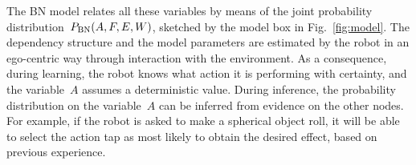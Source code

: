 The \ac{BN} model relates all these variables by means of the joint probability distribution~$P_{\text{BN}}(A, F, E, W)$, sketched by the \AffWords{} model box in Fig.~\ref{fig:model}.
The dependency structure and the model parameters are estimated by the robot in an ego-centric way through interaction with the environment.
As a consequence, during learning, the robot knows what action it is performing with certainty, and the variable~$A$ assumes a deterministic value.
During inference, the probability distribution on the variable~$A$ can be inferred from evidence on the other nodes.
For example, if the robot is asked to make a spherical object roll, it will be able to select the action tap as most likely to obtain the desired effect, based on previous experience.

\newcommand{\myscalefactor}{0.8}

\newcommand{\shapeOfHmmState}{circle} %

\newcommand{\standardhmm}[1]{
    \node[draw,\shapeOfHmmState] (hmm#1s1) {$s_1$};
    \node[draw,\shapeOfHmmState, right of=hmm#1s1] (hmm#1s2) {$s_2$};
    \node[\shapeOfHmmState, right of=hmm#1s2] (hmm#1s3) {\dots};
    \node[draw,\shapeOfHmmState, right of=hmm#1s3] (hmm#1s4) {$s_Q$};
    \node[left of=hmm#1s1]  (invisible1) {};
    \node[right of=hmm#1s4] (invisible2) {};
    \path[->] (hmm#1s1) edge (hmm#1s2);
    \path[loop above] (hmm#1s1) edge (hmm#1s1);
    \path[->] (hmm#1s2) edge (hmm#1s3);
    \path[loop above] (hmm#1s2) edge (hmm#1s2);
    \path[dashed] (hmm#1s2) -- (hmm#1s3);
    \path[->] (hmm#1s3) edge (hmm#1s4);
    \path[loop above] (hmm#1s4) edge (hmm#1s4);
    \path[->] (invisible1) edge (hmm#1s1);
    \path[->] (hmm#1s4) edge (invisible2);
}

\newcommand{\modeltwo}{
  \begin{tikzpicture}[scale=\myscalefactor, every node/.style={scale=\myscalefactor}]
  \matrix (M) [matrix of nodes, ampersand replacement=\&] {%
    grasp gesture HMM \& \standardhmm{1} \\
    tap gesture HMM \& \standardhmm{2} \\
    touch gesture HMM \& \standardhmm{3} \\
  };
  \end{tikzpicture}
}



